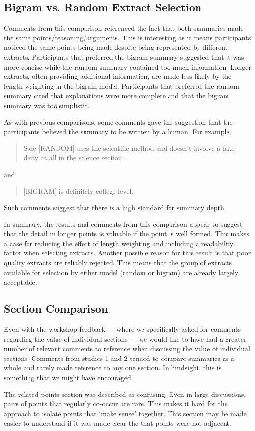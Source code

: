     \tocless\subsection{Bigram vs. Random Extract Selection}
      Comments from this comparison referenced the fact that both summaries made the same points/reasoning/arguments. This is interesting as it means participants noticed the same points being made despite being represented by different extracts. Participants that preferred the bigram summary suggested that it was more concise while the random summary contained too much information. Longer extracts, often providing additional information, are made less likely by the length weighting in the bigram model. Participants that preferred the random summary cited that explanations were more complete and that the bigram summary was too simplistic.

      As with previous comparisons, some comments gave the suggestion that the participants believed the summary to be written by a human. For example, \blockquote{Side [RANDOM] uses the scientific method and doesn't involve a fake deity at all in the science section.} and \blockquote{[BIGRAM] is definitely college level.}. Such comments suggest that there is a high standard for summary depth.

      In summary, the results and comments from this comparison appear to suggest that the detail in longer points is valuable if the point is well formed. This makes a case for reducing the effect of length weighting and including a readability factor when selecting extracts. Another possible reason for this result is that poor quality extracts are reliably rejected. This means that the group of extracts available for selection by either model (random or bigram) are already largely acceptable.

    \tocless\subsection{Section Comparison}
      Even with the workshop feedback --- where we specifically asked for comments regarding the value of individual sections --- we would like to have had a greater number of relevant comments to reference when discussing the value of individual sections. Comments from studies 1 and 2 tended to compare summaries as a whole and rarely made reference to any one section. In hindsight, this is something that we might have encouraged.

      The related points section was described as confusing. Even in large discussions, pairs of points that regularly co-occur are rare. This makes it hard for the approach to isolate points that `make sense' together. This section may be made easier to understand if it was made clear the that points were not adjacent.

